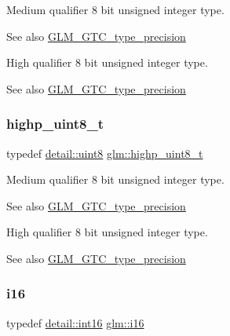 Medium qualifier 8 bit unsigned integer type. \begin{DoxySeeAlso}{See also}
\mbox{\hyperlink{group__gtc__type__precision}{G\+L\+M\+\_\+\+G\+T\+C\+\_\+type\+\_\+precision}}
\end{DoxySeeAlso}
High qualifier 8 bit unsigned integer type. \begin{DoxySeeAlso}{See also}
\mbox{\hyperlink{group__gtc__type__precision}{G\+L\+M\+\_\+\+G\+T\+C\+\_\+type\+\_\+precision}} 
\end{DoxySeeAlso}
\mbox{\label{group__gtc__type__precision_ga9ba529fcc75b82d23da979f0ce6e4518}} 
\subsubsection{\texorpdfstring{highp\+\_\+uint8\+\_\+t}{highp\_uint8\_t}}
{\footnotesize\ttfamily typedef \mbox{\hyperlink{namespaceglm_1_1detail_aef2588f97d090cc19fbbe0c74fe17c8f}{detail\+::uint8}} \mbox{\hyperlink{group__gtc__type__precision_ga9ba529fcc75b82d23da979f0ce6e4518}{glm\+::highp\+\_\+uint8\+\_\+t}}}

Medium qualifier 8 bit unsigned integer type. \begin{DoxySeeAlso}{See also}
\mbox{\hyperlink{group__gtc__type__precision}{G\+L\+M\+\_\+\+G\+T\+C\+\_\+type\+\_\+precision}}
\end{DoxySeeAlso}
High qualifier 8 bit unsigned integer type. \begin{DoxySeeAlso}{See also}
\mbox{\hyperlink{group__gtc__type__precision}{G\+L\+M\+\_\+\+G\+T\+C\+\_\+type\+\_\+precision}} 
\end{DoxySeeAlso}
\mbox{\label{group__gtc__type__precision_ga35e5542ca05b29cc256fdafb8503d1fd}} 
\subsubsection{\texorpdfstring{i16}{i16}}
{\footnotesize\ttfamily typedef \mbox{\hyperlink{namespaceglm_1_1detail_a375938874ca4f0a0982ec6373b56117b}{detail\+::int16}} \mbox{\hyperlink{group__gtc__type__precision_ga35e5542ca05b29cc256fdafb8503d1fd}{glm\+::i16}}}

